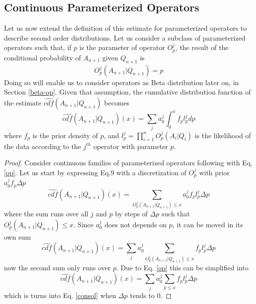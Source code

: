 \documentclass[runningheads]{llncs}
\begin{document}
\subsection{Continuous Parameterized Operators}
Let us now extend the definition of this estimate for parameterized
operators to describe second order distributions. Let us consider a
subclass of parameterized operators such that, if $p$ is the parameter
of operator $O^j_p$, the result of the conditional probability of
$A_{n+1}$ given $Q_{n+1}$ is
\begin{equation}
  \label{op}
O^j_p(A_{n+1}|Q_{n+1})=p
\end{equation}
Doing so will enable us to consider operators as Beta distribution
later on, in Section \ref{beta-op}.
Given that assumption, the cumulative distribution function of the
estimate $\hat{cdf}(A_{n+1}|Q_{n+1})$ becomes
\begin{equation}
  \label{consol}
  \hat{cdf}(A_{n+1}|Q_{n+1})(x) = \sum_j a_0^j \int_0^x f_p l_p^j dp
\end{equation}
where $f_p$ is the prior density of $p$, and
$l_p^j= \prod_{i=1}^{n} O^j_p(A_i|Q_i)$ is the likelihood of the data
according to the $j^{th}$ operator with parameter $p$.
\begin{proof}
  Consider continuous families of parameterized operators following
  with Eq. \ref{op}. Let us start by expressing Eq.9 with a
  discretization of $O^j_p$ with prior $a^j_0 f_p \Delta p$
\begin{equation}
  \hat{cdf}(A_{n+1}|Q_{n+1})(x) = \sum_{O^j_p(A_{n+1}|Q_{n+1})\le x}
  a_0^j f_p l_p^j \Delta p
\end{equation}
where the sum runs over all $j$ and $p$ by steps of $\Delta p$ such
that $O^j_p(A_{n+1}|Q_{n+1})\le x$. Since $a_0^j$ does not depends on
$p$, it can be moved in its own sum
\begin{equation}
  \hat{cdf}(A_{n+1}|Q_{n+1})(x) = \sum_j a_0^j
  \sum_{O^j_p(A_{n+1}|Q_{n+1})\le x} f_p l_p^j \Delta p
\end{equation}
now the second sum only runs over $p$. Due to Eq. \ref{op} this can be
simplified into
\begin{equation}
  \hat{cdf}(A_{n+1}|Q_{n+1})(x) = \sum_j a_0^j \sum_{p\le x} f_p l_p^j
  \Delta p
\end{equation}
which is turns into Eq. \ref{consol} when $\Delta p$ tends to 0.
\end{proof}
\end{document}
